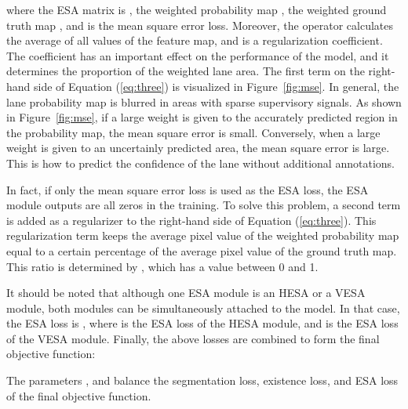 \documentclass[10pt,twocolumn,letterpaper]{article}
\begin{document}
\noindent
where the ESA matrix is , the weighted probability map , the weighted ground truth map , and  is the mean square error loss. Moreover, the operator  calculates the average of all values of the feature map, and  is a regularization coefficient. The coefficient  has an important effect on the performance of the model, and it determines the proportion of the weighted lane area. The first term on the right-hand side of Equation (\ref{eq:three}) is visualized in Figure~\ref{fig:mse}. In general, the lane probability map is blurred in areas with sparse supervisory signals. As shown in Figure~\ref{fig:mse}, if a large weight is given to the accurately predicted region in the probability map, the mean square error is small. Conversely, when a large weight is given to an uncertainly predicted area, the mean square error is large. This is how to predict the confidence of the lane without additional annotations.

In fact, if only the mean square error loss is used as the ESA loss, the ESA module outputs are all zeros in the training. To solve this problem, a second term is added as a regularizer to the right-hand side of Equation (\ref{eq:three}). This regularization term keeps the average pixel value of the weighted probability map equal to a certain percentage of the average pixel value of the ground truth map. This ratio is determined by , which has a value between 0 and 1.

It should be noted that although one ESA module is an HESA or a VESA module, both modules can be simultaneously attached to the model. In that case, the ESA loss is , where  is the ESA loss of the HESA module, and  is the ESA loss of the VESA module. Finally, the above losses are combined to form the final objective function:



\noindent
The parameters ,  and  balance the segmentation loss, existence loss, and ESA loss of the final objective function.
\end{document}
